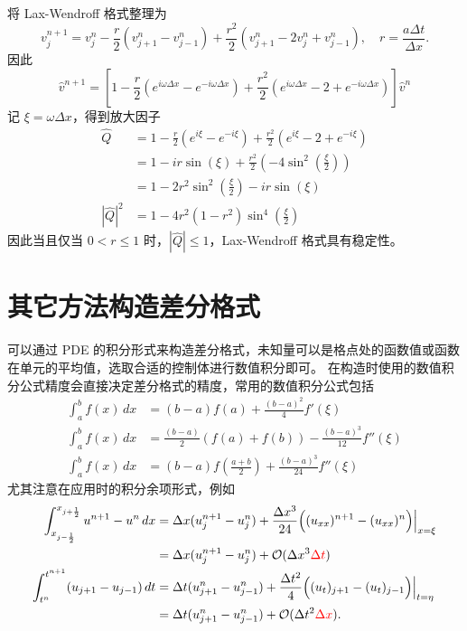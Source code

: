 \begin{solution*}
    将 Lax-Wendroff 格式整理为
    \[
        v_{j}^{n+1}
        = v_j^n - \frac{r}2(v_{j+1}^n- v_{j-1}^n) + \frac{r^2}2
        (v_{j+1}^n-2v_{j}^n+v_{j-1}^n),
        \quad r = \frac{a \Delta t}{\Delta x}.
    \]
    因此
    \[
        \hat{v}^{n+1} = \left[
            1 - \frac{r}2(e^{i \omega \Delta x} - e^{- i \omega \Delta x})
            + \frac{r^2}2 (e^{i \omega \Delta x} - 2 + e^{- i \omega \Delta x})
            \right] \hat{v}^n
    \]
    记 $\xi = \omega \Delta x$，得到放大因子
    \begin{align*}
        \widehat{Q}
                        & = 1 - \frac{r}2(e^{i \xi} - e^{- i \xi})
        + \frac{r^2}2 (e^{i \xi} - 2 + e^{- i \xi})
        \\
                        & =
        1 -  i r \sin(\xi) + \frac{r^2}2 (-4 \sin^2(\frac{\xi}2))
        \\
                        & = 1 - 2r^2 \sin^2(\frac{\xi}2)
        - i r \sin(\xi)                                            \\
        |\widehat{Q}|^2 & =
        1 - 4 r^2 (1-r^2) \sin^4(\frac{\xi}2)
    \end{align*}
    因此当且仅当 $0 < r \le 1$ 时，$|\widehat{Q}| \le 1$，Lax-Wendroff 格式具有稳定性。
\end{solution*}


\section{其它方法构造差分格式}

可以通过 PDE 的积分形式来构造差分格式，未知量可以是格点处的函数值或函数在单元的平均值，选取合适的控制体进行数值积分即可。
在构造时使用的数值积分公式精度会直接决定差分格式的精度，常用的数值积分公式包括
\begin{align*}
    \int_{a}^{b} f(x)\,dx & = (b-a) f(a) + \frac{(b-a)^2}4 f'(\xi)                     \\
    \int_{a}^{b} f(x)\,dx & = \frac{(b-a)}{2}(f(a)+f(b)) - \frac{(b-a)^3}{12} f''(\xi) \\
    \int_{a}^{b} f(x)\,dx & = (b-a) f(\frac{a+b}2) + \frac{(b-a)^3}{24} f''(\xi)
\end{align*}
尤其注意在应用时的积分余项形式，例如
\begin{align*}
    \int_{x_{j-\frac12}}^{x_{j+\frac12}} u^{n+1} - u^n \,dx
    ={} & \Delta x (u_j^{n+1} - u_j^n) + \frac{\Delta x^3 }{24} \Big((u_{xx})^{n+1} - (u_{xx})^n\Big)\Big|_{x=\xi}       \\
    ={} & \Delta x (u_j^{n+1} - u_j^n) +  \mathcal{O}(\Delta x^3 {\color{red}\Delta t})                                  \\
    \int_{t^n}^{t^{n+1}} (u_{j+1} - u_{j-1})\, dt
    ={} & \Delta t (u_{j+1}^n - u_{j-1}^n) + \frac{\Delta t^2 }{4} \Big((u_{t})_{j+1} - (u_{t})_{j-1}\Big)\Big|_{t=\eta} \\
    ={} & \Delta t (u_{j+1}^n - u_{j-1}^n) + \mathcal{O}(\Delta t^2 {\color{red}\Delta x}).
\end{align*}

